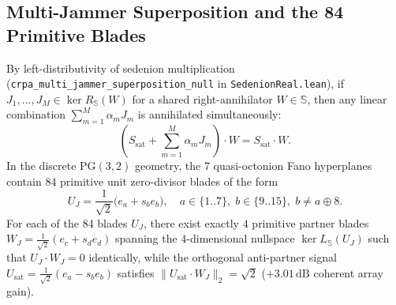 \documentclass[journal,twoside]{IEEEtran}
\theoremstyle{definition}
\theoremstyle{remark}
\newcommand{\Se}{\mathbb{S}}
\newcommand{\PG}{\mathrm{PG}}
\begin{document}
\subsection{Multi-Jammer Superposition and the 84 Primitive Blades}
By left-distributivity of sedenion multiplication (\texttt{crpa\_multi\_jammer\_superposition\_null} in \texttt{SedenionReal.lean}), if $J_1, \dots, J_M \in \ker R_{\Se}(W)$ for a shared right-annihilator $W \in \Se$, then any linear combination $\sum_{m=1}^M \alpha_m J_m$ is annihilated simultaneously:
\begin{equation}
    \left(S_{\mathrm{sat}} + \sum_{m=1}^M \alpha_m J_m\right) \cdot W = S_{\mathrm{sat}} \cdot W.
\end{equation}
In the discrete $\PG(3,2)$ geometry, the 7 quasi-octonion Fano hyperplanes contain $84$ primitive unit zero-divisor blades of the form
\begin{equation}
    U_J = \frac{1}{\sqrt{2}}\bigl(e_a + s_b e_b\bigr), \quad a \in \{1..7\},\; b \in \{9..15\},\; b \neq a \oplus 8.
    \label{eq:prim_blade}
\end{equation}
For each of the 84 blades $U_J$, there exist exactly $4$ primitive partner blades $W_J = \frac{1}{\sqrt{2}}(e_c + s_d e_d)$ spanning the 4-dimensional nullspace $\ker L_{\Se}(U_J)$ such that $U_J \cdot W_J = 0$ identically, while the orthogonal anti-partner signal $U_{\mathrm{sat}} = \frac{1}{\sqrt{2}}(e_a - s_b e_b)$ satisfies $\|U_{\mathrm{sat}} \cdot W_J\|_2 = \sqrt{2}$ ($+3.01\,\mathrm{dB}$ coherent array gain).

\end{document}
